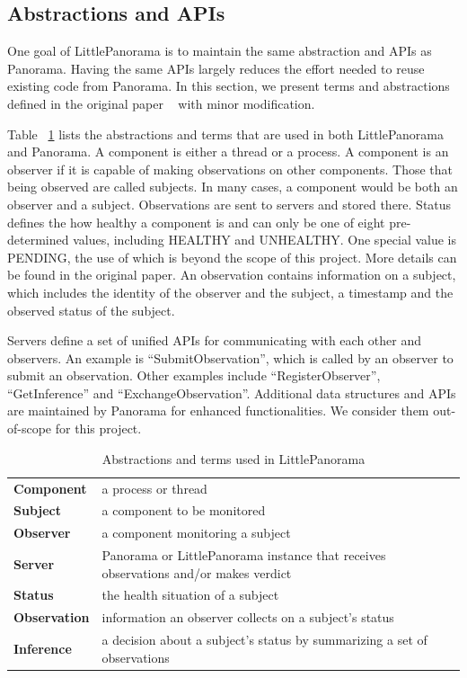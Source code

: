 \subsection{Abstractions and APIs}
One goal of LittlePanorama is to maintain the same abstraction and APIs as Panorama. Having the same APIs largely reduces the effort needed to reuse existing code from Panorama. In this section, we present terms and abstractions defined in the original paper ~\cite{huang2018capturing} with minor modification. 

Table ~\ref{tab:abs} lists the abstractions and terms that are used in both LittlePanorama and Panorama. A component is either a thread or a process. A component is an observer if it is capable of making observations on other components. Those that being observed are called subjects. In many cases, a component would be both an observer and a subject. Observations are sent to servers and stored there. 
Status defines the how healthy a component is and can only be one of eight pre-determined values, including HEALTHY and UNHEALTHY. One special value is PENDING, the use of which is beyond the scope of this project. More details can be found in the original paper. An observation contains information on a subject, which includes the identity of the observer and the subject, a timestamp and the observed status of the subject. 

Servers define a set of unified APIs for communicating with each other and observers. An example is ``SubmitObservation'', which is called by an observer to submit an observation. Other examples include ``RegisterObserver'', ``GetInference'' and ``ExchangeObservation''. Additional data structures and APIs are maintained by Panorama for enhanced functionalities. We consider them out-of-scope for this project. 

\begin{table}[!tb]
    \begin{tabular}{p{}p{}}%
    
    \toprule    
    \textbf{Component}   &    a process or thread  \\
    \textbf{Subject}   &    a component to be monitored  \\ 
    \textbf{Observer}   &    a component monitoring a subject  \\
    \textbf{Server}   &    Panorama or LittlePanorama instance that receives observations and/or makes verdict  \\
    \midrule
    \textbf{Status}   &    the health situation of a subject  \\
    \textbf{Observation}   &  information an observer collects on a subject's status  \\
    \textbf{Inference}  &    a decision about a subject's status by summarizing a set of observations\\
    \bottomrule
    \end{tabular}
    \vspace{0.5em}
    \caption{Abstractions and terms used in LittlePanorama}
    \label{tab:abs}
\end{table}

